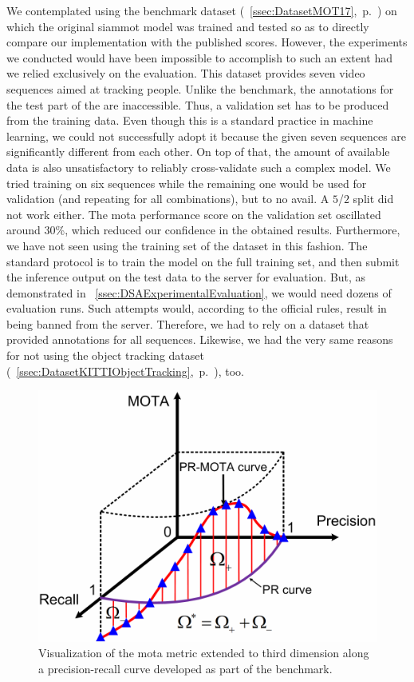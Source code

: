 We contemplated using the \motseventeen{} benchmark dataset (\sectiontext{}~\ref{ssec:DatasetMOT17},~p.~\pageref{ssec:DatasetMOT17}) on which the original \gls{siammot} model was trained and tested so as to directly compare our implementation with the published scores. However, the experiments we conducted would have been impossible to accomplish to such an extent had we relied exclusively on the \motseventeen{} evaluation. This dataset provides seven video sequences aimed at tracking people. Unlike the \uadetrac{} benchmark, the annotations for the test part of the \motseventeen{} are inaccessible. Thus, a validation set has to be produced from the training data. Even though this is a standard practice in machine learning, we could not successfully adopt it because the given seven sequences are significantly different from each other. On top of that, the amount of available data is also unsatisfactory to reliably cross-validate such a complex model. We tried training on six sequences while the remaining one would be used for validation (and repeating for all combinations), but to no avail. A $5$/$2$ split did not work either. The \gls{mota} performance score on the validation set oscillated around $30$\%, which reduced our confidence in the obtained results. Furthermore, we have not seen using the training set of the \motseventeen{} dataset in this fashion. The standard protocol is to train the model on the full training set, and then submit the inference output on the test data to the server for evaluation. But, as demonstrated in \sectiontext{}~\ref{ssec:DSAExperimentalEvaluation}, we would need dozens of evaluation runs. Such attempts would, according to the official rules, result in being banned from the server. Therefore, we had to rely on a dataset that provided annotations for all sequences. Likewise, we had the very same reasons for not using the \kitti{} object tracking dataset (\sectiontext{}~\ref{ssec:DatasetKITTIObjectTracking},~p.~\pageref{ssec:DatasetKITTIObjectTracking}), too.

\begin{figure}[t]
    \centerline{\includegraphics[width=0.5\linewidth]{figures/siamese_tracking/pr_mota_curve.pdf}}
    \caption[Visualization of \gls{mota} along a precision-recall curve]{Visualization of the \gls{mota} metric extended to third dimension along a precision-recall curve developed as part of the \uadetrac{} benchmark. }
    \label{fig:PRMOTAVisualization}
\end{figure}

